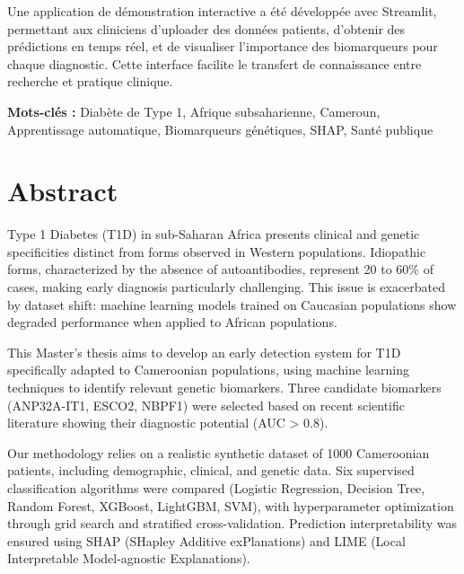 \documentclass[12pt,a4paper,oneside]{report}
\begin{document}
\vspace{0.3cm}

Une application de démonstration interactive a été développée avec Streamlit, permettant aux cliniciens d'uploader des données patients, d'obtenir des prédictions en temps réel, et de visualiser l'importance des biomarqueurs pour chaque diagnostic. Cette interface facilite le transfert de connaissance entre recherche et pratique clinique.

\vspace{0.3cm}

\textbf{Mots-clés :} Diabète de Type 1, Afrique subsaharienne, Cameroun, Apprentissage automatique, Biomarqueurs génétiques, SHAP, Santé publique

\clearpage

\chapter*{Abstract}

Type 1 Diabetes (T1D) in sub-Saharan Africa presents clinical and genetic specificities distinct from forms observed in Western populations. Idiopathic forms, characterized by the absence of autoantibodies, represent 20 to 60\% of cases, making early diagnosis particularly challenging. This issue is exacerbated by dataset shift: machine learning models trained on Caucasian populations show degraded performance when applied to African populations.

\vspace{0.3cm}

This Master's thesis aims to develop an early detection system for T1D specifically adapted to Cameroonian populations, using machine learning techniques to identify relevant genetic biomarkers. Three candidate biomarkers (ANP32A-IT1, ESCO2, NBPF1) were selected based on recent scientific literature showing their diagnostic potential (AUC > 0.8).

\vspace{0.3cm}

Our methodology relies on a realistic synthetic dataset of 1000 Cameroonian patients, including demographic, clinical, and genetic data. Six supervised classification algorithms were compared (Logistic Regression, Decision Tree, Random Forest, XGBoost, LightGBM, SVM), with hyperparameter optimization through grid search and stratified cross-validation. Prediction interpretability was ensured using SHAP (SHapley Additive exPlanations) and LIME (Local Interpretable Model-agnostic Explanations).
\end{document}
